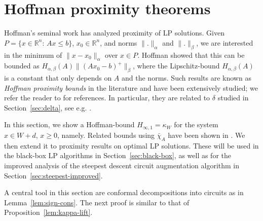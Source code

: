 \documentclass[11pt, a4paper]{article}
\newcommand{\1}{\mathbbm{1}}
\theoremstyle{case}
\newcommand{\R}{\mathbb{R}}
\begin{document}
\section{Hoffman proximity theorems}
\label{sec:hoffman}

Hoffman's seminal work \cite{Hoffman52} has analyzed proximity of LP solutions. Given $P=\{x\in \R^n:\, Ax\le b\}$, $x_0\in \R^n$, and norms $\|.\|_\alpha$ and $\|.\|_\beta$, we are interested in the minimum of 
$\|x-x_0\|_\alpha$ over $x\in P$.
Hoffman showed that this can be bounded as $H_{\alpha,\beta}(A)\|(Ax_0-b)^+\|_\beta$, where the Lipschitz-bound $H_{\alpha,\beta}(A)$ is a constant that only depends on $A$ and the norms. Such results are known as \emph{Hoffman proximity bounds} in the literature and have been extensively studied;  we refer the reader to \cite{Guler1995,Klatte1995,Pena2020} for references. In particular, they are related to  $\delta$ studied in Section~\ref{sec:delta}, see e.g. 
\cite{Guler1995}. 

In this section, we show a Hoffman-bound $H_{\infty,1}=\kappa_W$ for the system $x\in W+d,\, x\ge 0$, namely. Related bounds using $\bar\chi_A$ have been shown in \cite{ho2002}. We then extend it to proximity results on optimal LP solutions. These will be used in the black-box LP algorithms in Section~\ref{sec:black-box}, as well as for the improved analysis of the steepest descent circuit augmentation algorithm in Section~\ref{sec:steepest-improved}.

A central tool in this section are conformal decompositions into circuits as in Lemma~\ref{lem:sign-cons}. The next proof is similar to that of Proposition~\ref{lem:kappa-lift}.
\end{document}
